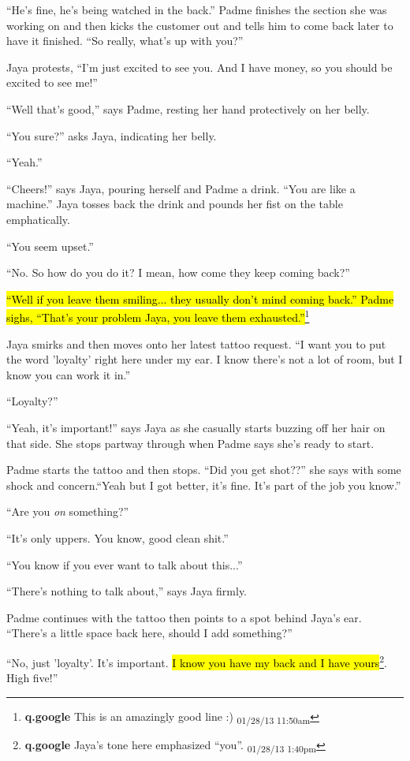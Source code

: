 ``He's fine, he's being watched in the back.''  Padme finishes the section she was working on and then kicks the customer out and tells him to come back later to have it finished.  ``So really, what's up with you?''

Jaya protests, ``I'm just excited to see you. And I have money, so you should be excited to see me!''

``Well that's good,'' says Padme, resting her hand protectively on her belly.

``You sure?'' asks Jaya, indicating her belly.

``Yeah.''

``Cheers!'' says Jaya, pouring herself and Padme a drink. ``You are like a machine.''  Jaya tosses back the drink and pounds her fist on the table emphatically.

``You seem upset.''

``No.  So how do you do it?  I mean, how come they keep coming back?''

\hl{``Well if you leave them smiling... they usually don't mind coming back.''  Padme sighs, ``That's your problem Jaya, you leave them exhausted.''}\footnote{\textbf{q.google }This is an amazingly good line :) \textsubscript{01/28/13 11:50am}}

Jaya smirks and then moves onto her latest tattoo request.  ``I want you to put the word 'loyalty' right here under my ear.  I know there's not a lot of room, but I know you can work it in.''

``Loyalty?''

``Yeah, it's important!'' says Jaya as she casually starts buzzing off her hair on that side.  She stops partway through when Padme says she's ready to start.



Padme starts the tattoo and then stops.  ``Did you get shot??'' she says with some shock and concern.``Yeah but I got better, it's fine.  It's part of the job you know.''

``Are you \textit{on }something?''

``It's only uppers.  You know, good clean shit.''

``You know if you ever want to talk about this...''

``There's nothing to talk about,'' says Jaya firmly.

Padme continues with the tattoo then points to a spot behind Jaya's ear.  ``There's a little space back here, should I add something?''

``No, just 'loyalty'.  It's important.  \hl{I know you have my back and I have yours}\footnote{\textbf{q.google }Jaya's tone here emphasized ``you''. \textsubscript{01/28/13 1:40pm}}.  High five!''

